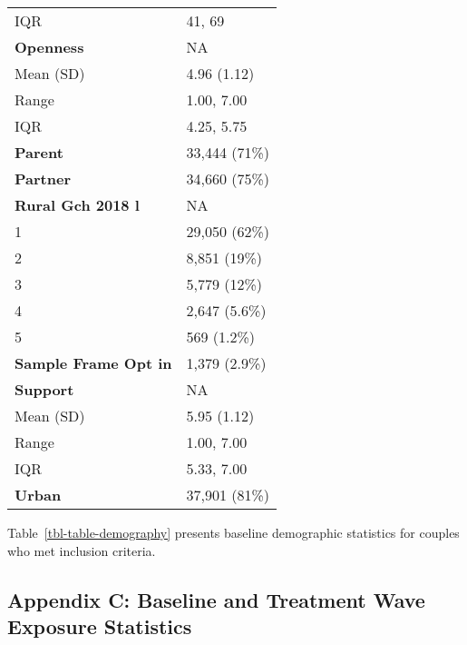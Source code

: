 \documentclass[
  singlecolumn]{article}
\begin{document}
\begin{longtable}[]{@{}ll@{}}
IQR & 41, 69 \\
\textbf{Openness} & NA \\
Mean (SD) & 4.96 (1.12) \\
Range & 1.00, 7.00 \\
IQR & 4.25, 5.75 \\
\textbf{Parent} & 33,444 (71\%) \\
\textbf{Partner} & 34,660 (75\%) \\
\textbf{Rural Gch 2018 l} & NA \\
1 & 29,050 (62\%) \\
2 & 8,851 (19\%) \\
3 & 5,779 (12\%) \\
4 & 2,647 (5.6\%) \\
5 & 569 (1.2\%) \\
\textbf{Sample Frame Opt in} & 1,379 (2.9\%) \\
\textbf{Support} & NA \\
Mean (SD) & 5.95 (1.12) \\
Range & 1.00, 7.00 \\
IQR & 5.33, 7.00 \\
\textbf{Urban} & 37,901 (81\%) \\
\end{longtable}

Table~\ref{tbl-table-demography} presents baseline demographic
statistics for couples who met inclusion criteria.

\subsection{Appendix C: Baseline and Treatment Wave Exposure
Statistics}\label{appendix-exposures}
\end{document}
